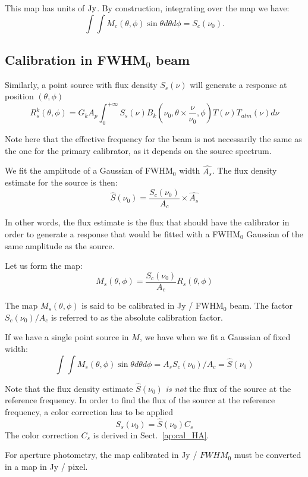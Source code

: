 This map has units of $\rm Jy$. By construction, integrating over the map we have:
\begin{equation}
\int\int M_{c}(\theta, \phi) \sin \theta d\theta d\phi = S_{c}(\nu_{0}).
\end{equation}



\subsection{Calibration in FWHM$_{0}$ beam}

Similarly, a point source with flux density $S_{s}(\nu)$ will
generate a response at position $(\theta, \phi)$
\begin{equation}
R_{s}^{k}(\theta, \phi) =  G_{k} A_{p}  \int_{0}^{+\infty}
S_{s}(\nu) B_{k}(\nu_{0}, \theta \times \frac{\nu}{\nu_{0}},
\phi) T(\nu) T_{atm}(\nu) d\nu
\end{equation}

Note here that the effective frequency for the beam is not necessarily
the same as the one for the primary calibrator, as it depends on the
source spectrum.

We fit the amplitude of a Gaussian of FWHM$_0$ width $\hat{A_{s}}$.
The flux density estimate for the source is then:
\begin{equation}
  \hat{S}(\nu_{0})  = \frac{S_{c}(\nu_{0})}{A_{c}} \times \hat{A_{s}}
\end{equation}

In other words, the flux estimate is the flux that should have the
calibrator in order to generate a response that would be fitted with a FWHM$_0$
Gaussian of the same amplitude as the source.

Let us form the map:
\begin{equation}
M_{s}(\theta, \phi) = \frac{S_{c} (\nu_{0})}{A_{c}}  R_{s}(\theta, \phi)   
\end{equation}

The map $M_{s}(\theta, \phi)$ is said to be calibrated in Jy / FWHM$_{0}$
beam. The factor $S_{c} (\nu_{0})/A_{c}$ is referred to as the
absolute calibration factor.

If we have a single point source in $M$, we have when we fit a Gaussian
of fixed width:
\begin{equation}
\int \int M_{s}(\theta, \phi) \sin \theta d\theta d\phi = \hat{A_{s}}  S_{c} (\nu_{0}) /
A_{c} = \hat{S}(\nu_{0})
\end{equation}

Note that the flux density estimate $\hat{S}(\nu_{0})$ {\em is not} the flux of the source at the
reference frequency. In order to find the flux of the source at the
reference frequency, a color correction has to be applied
\begin{equation}
S_{s}(\nu_{0}) = \hat{S}(\nu_{0})  C_{s}
\end{equation}
The color correction $C_{s}$ is derived in Sect.~\ref{ap:cal_HA}. 


For aperture photometry, the map calibrated in Jy / $FWHM_{0}$ must be
converted in a map in Jy / pixel. 

